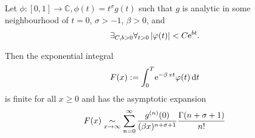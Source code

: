 Let $\phi\colon [0,1] \to \mathbb{C}, \phi(t) = t^\sigma g(t)$ such that $g$ is
analytic in some neighbourhood of $t=0$, $\sigma > -1$, $\beta > 0$, and
\begin{align*}
    \exists_{C, b > 0} \forall_{t > 0} \left|\phi(t)\right| < C \Eto{bt}.
\end{align*}

Then the exponential integral
\begin{align*}
    F(x) := \Integ[T]{0}{t}{\Eto{-\beta\,xt}\phi(t)}
\end{align*}
is finite for all $x \geq 0$ and has the asymptotic expansion
\begin{align*}
    F(x)\SimAs{x\to\infty}\sum_{n=0}^{\infty}
    \frac{g^{(n)}(0)}{(\beta x)^{n+\sigma+1}} \frac{\Gamma(n+\sigma+1)}{n!}
\end{align*}
